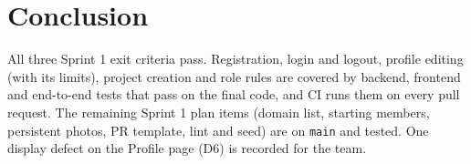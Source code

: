 \documentclass[11pt,a4paper]{article}
\begin{document}
\section{Conclusion}
All three Sprint 1 exit criteria pass. Registration, login and logout, profile editing (with its limits), project creation and role rules
are covered by backend, frontend and end-to-end tests that pass on the final code, and CI runs them on every pull request.
The remaining Sprint 1 plan items (domain list, starting members, persistent photos, PR template, lint and seed) are on \texttt{main} and tested.
One display defect on the Profile page (D6) is recorded for the team.

\end{document}

